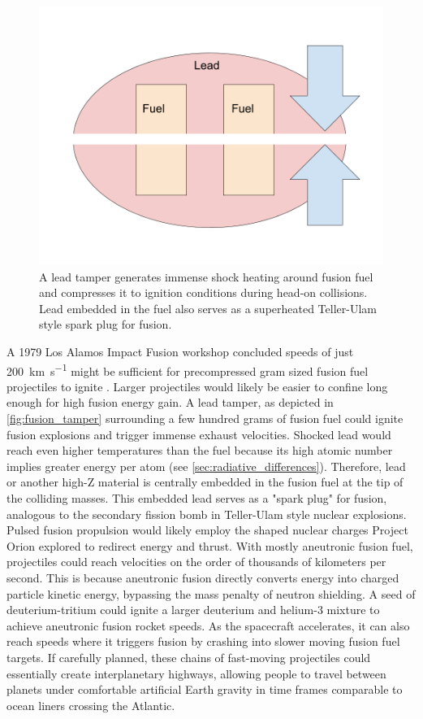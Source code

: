 \documentclass{article}
\begin{document}
\begin{figure}[htpb]
    \centering
    \includegraphics[width=0.5\linewidth]{images/Fusion Impactors.png}
    \caption{A lead tamper generates immense shock heating around fusion fuel and compresses it to ignition conditions during head-on collisions.  Lead embedded in the fuel also serves as a superheated Teller-Ulam style spark plug \cite{WikipediaThermonuclearWeapon} for fusion.}
    \label{fig:fusion_tamper}
\end{figure}

A 1979 Los Alamos Impact Fusion workshop concluded speeds of just \SI{200}{\kilo\meter\per\second} might be sufficient for precompressed gram sized fusion fuel projectiles to ignite \cite{impactfusion1979}.   Larger projectiles would likely be easier to confine long enough for high fusion energy gain.   A lead tamper, as depicted in \autoref{fig:fusion_tamper} surrounding a few hundred grams of fusion fuel could ignite fusion explosions and trigger immense exhaust velocities.  Shocked lead would reach even higher temperatures than the fuel because its high atomic number implies greater energy per atom (see \autoref{sec:radiative_differences}).  Therefore, lead or another high-Z material is centrally embedded in the fusion fuel at the tip of the colliding masses. This embedded lead serves as a "spark plug" for fusion, analogous to the secondary fission bomb in Teller-Ulam style \cite{WikipediaThermonuclearWeapon} nuclear explosions. Pulsed fusion propulsion would likely employ the shaped nuclear charges Project Orion explored to redirect energy and thrust.  
With mostly aneutronic fusion fuel, projectiles could reach velocities on the order of thousands of kilometers per second.  This is because aneutronic fusion directly converts energy into charged particle kinetic energy, bypassing the mass penalty of neutron shielding.  A seed of deuterium-tritium could ignite a larger deuterium and helium-3 mixture to achieve aneutronic fusion rocket speeds.   As the spacecraft accelerates, it can also reach speeds where it triggers fusion by crashing into slower moving fusion fuel targets.   If carefully planned, these chains of fast-moving projectiles could essentially create interplanetary highways, allowing people to travel between planets under comfortable artificial Earth gravity in time frames comparable to ocean liners crossing the Atlantic.  
\end{document}
